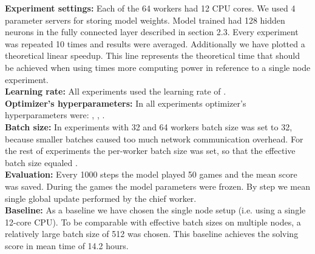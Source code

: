 \documentclass{llncs}
\begin{document}
\textbf{Experiment settings:} Each of the 64 workers had 12 CPU cores. We used 4 parameter servers for storing model weights. Model trained had 128 hidden neurons in the fully connected layer described in section 2.3. Every experiment was repeated 10 times and results were averaged. Additionally we have plotted a theoretical linear speedup. This line represents the theoretical time that should be achieved when using  times more computing power in reference to a single node experiment.\\
\textbf{Learning rate:} All experiments used the learning rate of .\\
\textbf{Optimizer's hyperparameters:} In all experiments optimizer's hyperparameters were: , , .\\
\textbf{Batch size:} In experiments with 32 and 64 workers batch size was set to 32, because smaller batches caused too much network communication overhead. For the rest of experiments the per-worker batch size was set, so that the effective batch size equaled .\\
\textbf{Evaluation:} Every 1000 steps the model played 50 games and the mean score was saved. During the games the model parameters were frozen. By step we mean single global update performed by the chief worker.\\
\textbf{Baseline:} As a baseline we have chosen the single node setup (i.e. using a single 12-core CPU). To be comparable with effective batch sizes on multiple nodes, a relatively large batch size of 512 was chosen. This baseline achieves the solving score in mean time of 14.2 hours.
\end{document}
